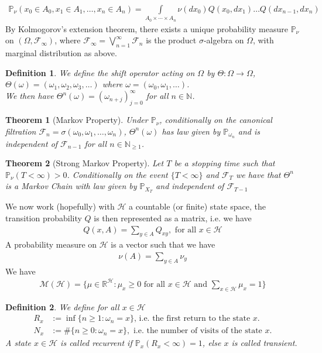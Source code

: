 \documentclass[11pt,a4paper, final]{article}
\newtheorem{thm}{Theorem}[section]
\newtheorem{defn}{Definition}[section]
\theoremstyle{definition}
\begin{document}
\begin{align*}
\mathbb{P}_\nu ( x_0 \in A_0 , x_1 \in A_1, \dots , x_n \in A_n ) = \int \limits_{A_0 \times \cdots \times A_n} \nu (dx_0) Q(x_0,dx_1) \dots Q(dx_{n-1}, dx_n)
\end{align*}
By Kolmogorov's extension theorem, there exists a unique probability measure $\mathbb{P}_\nu$ on $( \Omega, \mathcal{F}_\infty)$, where $\mathcal{F}_\infty = \bigvee_{n=1}^\infty \mathcal{F}_n$ is the product $\sigma$-algebra on $\Omega$, with marginal distribution as above. 
\begin{defn} We define the shift operator acting on $\Omega$ by $\Theta :\Omega \to \Omega$, $\Theta(\omega)=( \omega_1, \omega_2, \omega_3, \dots )$ where $\omega=( \omega_0, \omega_1, \dots )$. \\ We then have $\Theta^n( \omega) = ( \omega_{n+j})_{j=0}^\infty$ for all $n \in \mathbb{N}$.
\end{defn}
\begin{thm}[Markov Property] Under $\mathbb{P}_\nu$, conditionally on the canonical filtration $\mathcal{F}_n= \sigma( \omega_0, \omega_1, \dots , \omega_n)$, $\Theta^n ( \omega)$ has law given by $\mathbb{P}_{\omega_n}$ and is independent of $\mathcal{F}_{n-1}$ for all $n \in \mathbb{N}_{ \geq 1}$. 
\end{thm}
\begin{thm}[Strong Markov Property] Let $T$ be a stopping time such that $\mathbb{P}_\nu (T < \infty) >0 $. Conditionally on the event $\lbrace T < \infty \rbrace$ and $\mathcal{F}_T$ we have that $\Theta^n$ is a Markov Chain with law given by $\mathbb{P}_{X_T}$ and independent of $\mathcal{F}_{T-1}$ 
\end{thm}
We now work (hopefully) with $\mathcal{H}$ a countable (or finite) state space, the transition probability $Q$ is then represented as a matrix, i.e. we have 
\begin{align*}
Q(x,A) = \sum_{y \in A} Q_{xy}, \text{ for all } x \in \mathcal{H}
\end{align*}
A probability measure on $\mathcal{H}$ is a vector such that we have 
\begin{align*}
 \nu (A) = \sum_{y \in A} \nu_y 
\end{align*}
We have 
\begin{align*}
\mathcal{M}( \mathcal{H}) = \lbrace \mu \in \mathbb{R}^\mathcal{H} : \mu_x \geq 0 \text{ for all } x \in \mathcal{H} \text{ and } \sum_{x \in \mathcal{H}} \mu_x = 1 \rbrace 
\end{align*} 
\begin{defn} We define for all $x \in \mathcal{H}$
\begin{align*}
R_x &:= \inf \lbrace n \geq 1 : \omega_n = x \rbrace \text{, i.e. the first return to the state $x$.} \\
N_x &:= \# \lbrace n \geq 0 : \omega_n =x \rbrace, \text{ i.e. the number of visits of the state $x$.}
\end{align*}
A state $x \in \mathcal{H}$ is called recurrent if $\mathbb{P}_x ( R_x < \infty ) =1$, else $x$ is called transient. 
\end{defn}
\end{document}
